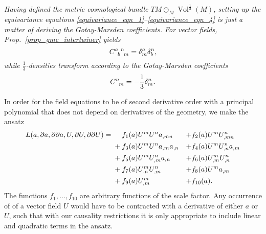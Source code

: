 \itshape
Having defined the metric cosmological bundle $TM \oplus_M \operatorname{Vol}^{\frac{1}{3}}(M)$, setting up the equivariance equations \eqref{equivariance_eqn_1}--\eqref{equivariance_eqn_4} is just a matter of deriving the Gotay-Marsden coefficients. For vector fields, Prop.~\ref{prop_gmc_intertwiner} yields
\begin{equation}
  \gmc{a}{b}{n}{m} = \delta^a_m \delta^n_b,
\end{equation}
while $\frac{1}{3}$-densities transform according to the Gotay-Marsden coefficients
\begin{equation}
  \gmc{}{}{n}{m} = -\frac{1}{3} \delta^n_m.
\end{equation}

\normalfont
In order for the field equations to be of second derivative order with a principal polynomial that does not depend on derivatives of the geometry, we make the ansatz
\begin{equation}
  \begin{aligned}
    L(a,\partial a, \partial\partial a, U, \partial U, \partial\partial U) = {} & \mathbin{\hphantom{+}} f_1(a) U^m U^n a_{,mn} & + & f_2(a) U^m U^n_{,mn} \\
    {} & + f_3(a) U^m U^n a_{,m} a_{,n} & + & f_4(a) U^m U^n_{,n} a_{,m} \\
    {} & + f_5(a) U^m U^n_{,m} a_{,n} & + & f_6(a) U^m_{,m} U^n_{,n} \\
    {} & + f_7(a) U^m_{,n} U^n_{,m} & + & f_8(a) U^m a_{,m} \\
    {} & + f_9(a) U^m_{,m} & + & f_{10}(a).
  \end{aligned}
\end{equation}
The functions $f_1,\dots, f_{10}$ are arbitrary functions of the scale factor. Any occurrence of of a vector field $U$ would have to be contracted with a derivative of either $a$ or $U$, such that with our causality restrictions it is only appropriate to include linear and quadratic terms in the ansatz.

